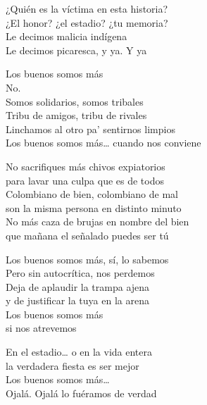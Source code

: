 \begin{lyrics}
¿Quién es la víctima en esta historia?\\
¿El honor? ¿el estadio? ¿tu memoria?\\
Le decimos malicia indígena\\
Le decimos picaresca, y ya. Y ya

Los buenos somos más\\
No.\\
Somos solidarios, somos tribales\\
Tribu de amigos, tribu de rivales\\
Linchamos al otro pa' sentirnos limpios\\
Los buenos somos más… cuando nos conviene

No sacrifiques más chivos expiatorios\\
para lavar una culpa que es de todos\\
Colombiano de bien, colombiano de mal\\
son la misma persona en distinto minuto\\
No más caza de brujas en nombre del bien\\
que mañana el señalado puedes ser tú

Los buenos somos más, sí, lo sabemos\\
Pero sin autocrítica, nos perdemos\\
Deja de aplaudir la trampa ajena\\
y de justificar la tuya en la arena\\
Los buenos somos más\\
si nos atrevemos

En el estadio… o en la vida entera\\
la verdadera fiesta es ser mejor\\
Los buenos somos más…\\
Ojalá. Ojalá lo fuéramos de verdad
\end{lyrics}

